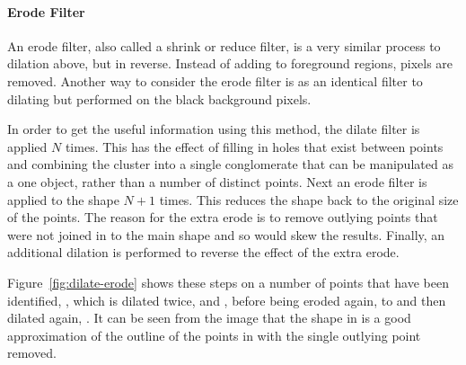 \paragraph{Erode Filter}
\label{par:erode_filter}

An erode filter, also called a shrink or reduce filter, is a very similar
process to dilation above, but in reverse. Instead of adding to foreground
regions, pixels are removed. Another way to consider the erode filter is as an
identical filter to dilating but performed on the black background pixels.

In order to get the useful information using this method, the dilate filter is
applied $N$ times. This has the effect of filling in holes that exist
between points and combining the cluster into a single conglomerate that can be
manipulated as a one object, rather than a number of distinct points. Next an
erode filter is applied to the shape $N+1$ times. This reduces the shape back
to the original size of the points. The reason for the extra erode is to remove
outlying points that were not joined in to the main shape and so would skew the
results. Finally, an additional dilation is performed to reverse the effect of
the extra erode.

Figure~\ref{fig:dilate-erode} shows these steps on a number of points that have
been identified, , which is dilated twice,  and
, before being eroded again,  to
 and then dilated again, . It can be seen from
the image that the shape in  is a good approximation of the
outline of the points in  with the single outlying point
removed.


